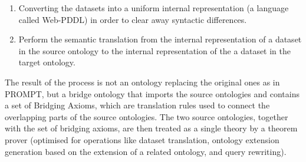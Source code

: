 \begin{enumerate}
\item Converting the datasets into a uniform internal representation (a
language called Web-PDDL) in order to clear away syntactic differences.

\item Perform the semantic translation from the internal representation
of a dataset in the source ontology to the internal representation of
the a dataset in the target ontology. 
\end{enumerate}
The result of the process is not an ontology replacing the original ones
as in PROMPT, but a bridge ontology that imports the source ontologies
and contains a set of Bridging Axioms, which are translation rules used
to connect the overlapping parts of the source ontologies. The two
source ontologies, together with the set of bridging axioms, are then
treated as a single theory by a theorem prover (optimised for
operations like dataset translation, ontology extension generation
based on the extension of a related ontology, and query rewriting). 